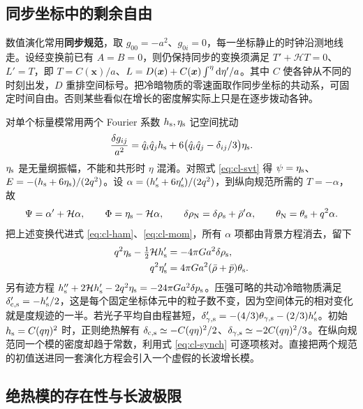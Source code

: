 \subsection{同步坐标中的剩余自由}

数值演化常用\textbf{同步规范}，取 $g_{00}=-a^2$、$g_{0i}=0$，每一坐标静止的时钟沿测地线走。设经变换前已有 $A=B=0$，则仍保持同步的变换须满足 $T'+\mathcal H T=0$、$L'=T$，即 $T=C(\bm x)/a$、$L=D(\bm x)+C(\bm x)\int^\eta \dd\eta'/a$。其中 $C$ 使各钟从不同的时刻出发，$D$ 重排空间标号。把冷暗物质的零速面取作同步坐标的共动系，可固定时间自由。否则某些看似在增长的密度解实际上只是在逐步拨动各钟。

对单个标量模常用两个 Fourier 系数 $h_{\rm s},\eta_{\rm s}$ 记空间扰动
\[
 \frac{\delta g_{ij}}{a^2}
  =\hat q_i\hat q_j h_{\rm s}
       +6\big(\hat q_i\hat q_j-\delta_{ij}/3\big)\eta_{\rm s}.
\]
$\eta_{\rm s}$ 是无量纲振幅，不能和共形时 $\eta$ 混淆。对照式 \eqref{eq:cl-svt} 得 $\psi=\eta_{\rm s}$、$E=-(h_{\rm s}+6\eta_{\rm s})/(2q^2)$。设 $\alpha=(h_{\rm s}'+6\eta_{\rm s}')/(2q^2)$，到纵向规范所需的 $T=-\alpha$，故
\begin{equation}\label{eq:cl-synch}
 \Psi=\alpha'+\mathcal H\alpha,\qquad
 \Phi=\eta_{\rm s}-\mathcal H\alpha,\qquad
 \delta\rho_{\rm N}=\delta\rho_{\rm s}+\bar\rho'\alpha,\qquad
 \theta_{\rm N}=\theta_{\rm s}+q^2\alpha .
\end{equation}
把上述变换代进式 \eqref{eq:cl-ham}、\eqref{eq:cl-mom}，所有 $\alpha$ 项都由背景方程消去，留下
\begin{align*}
 q^2\eta_{\rm s}-\tfrac12\mathcal H h_{\rm s}'&=-4\pi G a^2\delta\rho_{\rm s},\\
 q^2\eta_{\rm s}'&=4\pi G a^2(\bar\rho+\bar p)\theta_{\rm s}.
\end{align*}
另有迹方程 $h_{\rm s}''+2\mathcal H h_{\rm s}'-2q^2\eta_{\rm s}=-24\pi G a^2\delta p_{\rm s}$。压强可略的共动冷暗物质满足 $\delta_{\rm c,s}'=-h_{\rm s}'/2$，这是每个固定坐标体元中的粒子数不变，因为空间体元的相对变化就是度规迹的一半。若光子平均自由程甚短，$\delta_{\gamma,\rm s}'=-(4/3)\theta_{\gamma,\rm s}-(2/3)h_{\rm s}'$。初始 $h_{\rm s}=C(q\eta)^2$ 时，正则绝热解有 $\delta_{\rm c,s}\simeq-C(q\eta)^2/2$、$\delta_{\gamma,\rm s}\simeq-2C(q\eta)^2/3$。在纵向规范同一个模的密度却趋于常数，利用式 \eqref{eq:cl-synch} 可逐项核对。直接把两个规范的初值送进同一套演化方程会引入一个虚假的长波增长模。


\subsection{绝热模的存在性与长波极限}

